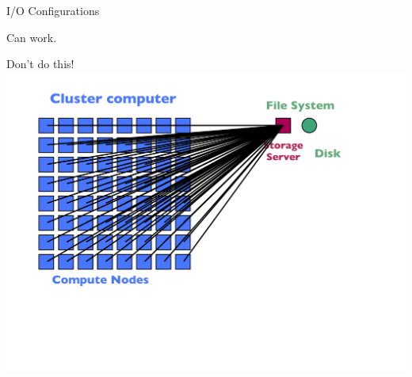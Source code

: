 \begin{frame}{I/O Configurations}
\begin{minipage}{0.32\textwidth}
\begin{block}{Can work.}
    \end{block}
  \end{minipage}\hspace{1ex}
  \begin{minipage}{0.32\textwidth}
    \begin{block}{Don't do this!}
      \includegraphics[trim=0 140 30 40,clip,width=1\textwidth]{../common/pics/hardware/ParallelHardware16.pdf}
    \end{block}
  \end{minipage}
\end{frame}


